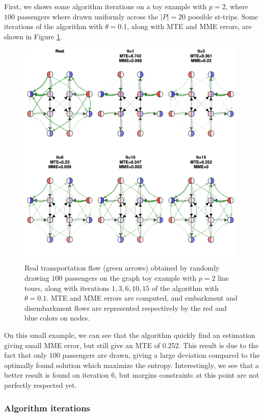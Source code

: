 \documentclass{bmcart}
\begin{document}
First, we shows some algorithm iterations on a toy example with $p=2$, where $100$ passengers where drawn uniformly across the $\vert P \vert = 20$ possible st-trips. Some iterations of the algorithm with $\theta=0.1$, along with MTE and MME errors, are shown in Figure \ref{iteration_plots}. 
\begin{figure}[h]
	\label{iteration_plots}
	\includegraphics[width=0.98\textwidth]{fig/iterations.pdf}
	\caption{Real transportation flow (green arrows) obtained by randomly drawing $100$ passengers on the graph toy example with $p=2$ line tours, along with iterations $1, 3, 6, 10, 15$ of the algorithm with $\theta=0.1$. MTE and MME errors are computed, and embarkment and disembarkment flows are represented respectively by the red and blue colors on nodes.}
\end{figure}
On this small example, we can see that the algorithm quickly find an estimation giving small MME error, but still give an MTE of 0.252. This result is due to the fact that only $100$ passengers are drawn, giving a large deviation compared to the optimally found solution which maximize the entropy. Interestingly, we see that a better result is found on iteration 6, but margins constraints at this point are not perfectly respected yet.

\subsubsection{Algorithm iterations}
\label{algorithm_iterations}
\end{document}

